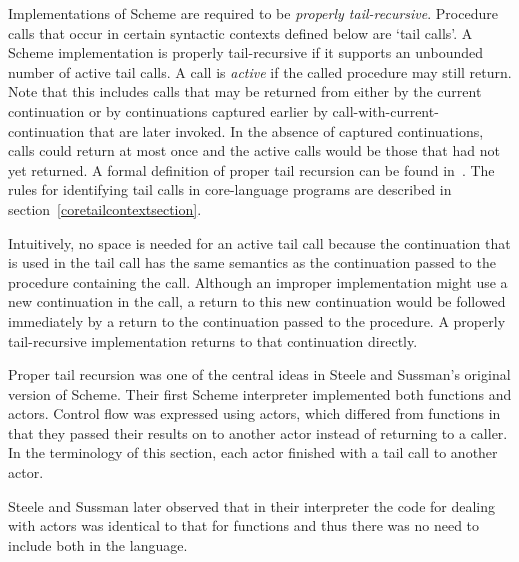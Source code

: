 Implementations of Scheme are required to be
{\em properly tail-recursive}.
Procedure calls that occur in certain syntactic
contexts defined below are `tail calls'.  A Scheme implementation is
properly tail-recursive if it supports an unbounded number of active
tail calls.  A call is {\em active} if the called procedure may still
return.  Note that this includes calls that may be returned from either
by the current continuation or by continuations captured earlier by
{\cf call-with-current-continuation} that are later invoked.
In the absence of captured continuations, calls could
return at most once and the active calls would be those that had not
yet returned.
A formal definition of proper tail recursion can be found
in~\cite{propertailrecursion}.  The rules for identifying tail calls
in core-language programs are described in
section~\ref{coretailcontextsection}.

\begin{rationale}

Intuitively, no space is needed for an active tail call because the
continuation that is used in the tail call has the same semantics as the
continuation passed to the procedure containing the call.  Although an improper
implementation might use a new continuation in the call, a return
to this new continuation would be followed immediately by a return
to the continuation passed to the procedure.  A properly tail-recursive
implementation returns to that continuation directly.

Proper tail recursion was one of the central ideas in Steele and
Sussman's original version of Scheme.  Their first Scheme interpreter
implemented both functions and actors.  Control flow was expressed using
actors, which differed from functions in that they passed their results
on to another actor instead of returning to a caller.  In the terminology
of this section, each actor finished with a tail call to another actor.

Steele and Sussman later observed that in their interpreter the code
for dealing with actors was identical to that for functions and thus
there was no need to include both in the language.

\end{rationale}


